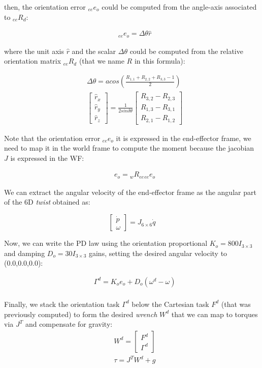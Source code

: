 \documentclass[11pt]{article}
\newcommand{\mat}[1]{\ensuremath{\begin{bmatrix}#1\end{bmatrix}}}	%
\begin{document}
then, the orientation error ${}_{ee}e_o$ could be computed from the angle-axis associated to ${}_{ee}R_d$:


\begin{align}
& {}_{ee}e_o = \Delta\theta \hat{r}
\end{align}

where the unit axis $\hat{r}$  and the scalar $\Delta \theta$ could be computed from 
the relative orientation matrix ${}_{ee}R_d$ (that we name $R$ in this formula): 

\begin{align}
& \Delta \theta = acos\left(\frac{R_{1,1} + R_{2,2} +R_{3,3} -1}{2}\right)\\
&\mat{\hat{r}_x \\ \hat{r}_y\\ \hat{r}_z} = \frac{1}{2sin \delta \theta} \mat{R_{3,2} - R_{2,3} \\R_{1,3} - R_{3,1}\\R_{2,1} - R_{1,2}}
\end{align}



Note that  the orientation error ${}_{ee}e_o$ it is expressed in the end-effector frame,
we need to map it in the world frame to compute the moment because the jacobian $J$ is expressed in the WF:

\begin{align}
&e_o = {}_wR_{ee} {}_{ee} e_o
\end{align}

We can extract the angular velocity of the end-effector frame as the angular part of the 6D \textit{twist} obtained as:

\begin{equation}
\mat{\dot{p}\\ \omega} = J_{6\times6} \dot{q}
\end{equation}

Now, we can write the PD law using the orientation proportional $K_{o} = 800I_{3\times3}$ and damping $D_o = 30I_{3\times3}$ gains, setting the desired angular velocity to (0.0,0.0,0.0): 

\begin{align}
& \Gamma^d  = K_{o} e_o  + D_o(\omega^d - \omega)  \\
\end{align}

Finally, we stack the orientation task $\Gamma^d$ below  the Cartesian task $F^d$ (that was previously computed) to form the desired \textit{wrench} $W^d$ that we can map to torques via $J^T$ and compensate for gravity:
\begin{align}
&W^d=\mat{F^d \\ \Gamma^d}\\
&\tau = J^TW^d + g
\end{align}
\end{document}

